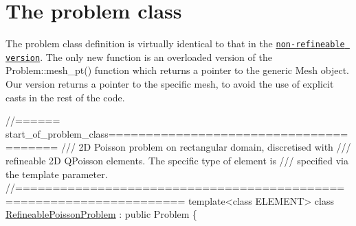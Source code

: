  

\hypertarget{index_problem}{}\section{The problem class}\label{index_problem}
The problem class definition is virtually identical to that in the \href{../../../poisson/two_d_poisson/html/index.html}{\tt non-\/refineable version}. The only new function is an overloaded version of the {\ttfamily Problem\+::mesh\+\_\+pt()} function which returns a pointer to the generic {\ttfamily Mesh} object. Our version returns a pointer to the specific mesh, to avoid the use of explicit casts in the rest of the code.

 
\begin{DoxyCodeInclude}
\textcolor{comment}{//====== start\_of\_problem\_class=======================================}
\textcolor{comment}{/// 2D Poisson problem on rectangular domain, discretised with}
\textcolor{comment}{}\textcolor{comment}{/// refineable 2D QPoisson elements. The specific type of element is}
\textcolor{comment}{}\textcolor{comment}{/// specified via the template parameter.}
\textcolor{comment}{}\textcolor{comment}{//====================================================================}
\textcolor{keyword}{template}<\textcolor{keyword}{class} ELEMENT> 
\textcolor{keyword}{class }\hyperlink{classRefineablePoissonProblem}{RefineablePoissonProblem} : \textcolor{keyword}{public} Problem
\{


\end{DoxyCodeInclude}
